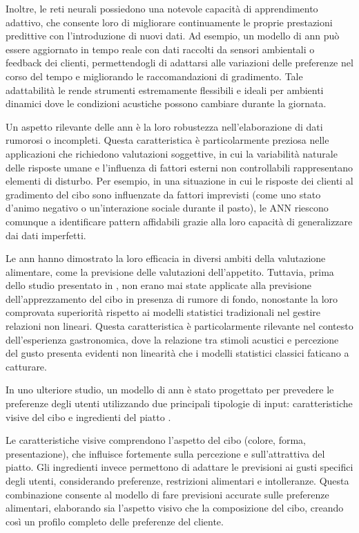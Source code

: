 Inoltre, le reti neurali possiedono una notevole capacità di apprendimento adattivo, che consente loro di migliorare continuamente le proprie prestazioni predittive con l'introduzione di nuovi dati. Ad esempio, un modello di \gls{ann} può essere aggiornato in tempo reale con dati raccolti da sensori ambientali o feedback dei clienti, permettendogli di adattarsi alle variazioni delle preferenze nel corso del tempo e migliorando le raccomandazioni di gradimento. Tale adattabilità le rende strumenti estremamente flessibili e ideali per ambienti dinamici dove le condizioni acustiche possono cambiare durante la giornata.

Un aspetto rilevante delle \gls{ann} è la loro robustezza nell'elaborazione di dati rumorosi o incompleti. Questa caratteristica è particolarmente preziosa nelle applicazioni che richiedono valutazioni soggettive, in cui la variabilità naturale delle risposte umane e l'influenza di fattori esterni non controllabili rappresentano elementi di disturbo. Per esempio, in una situazione in cui le risposte dei clienti al gradimento del cibo sono influenzate da fattori imprevisti (come uno stato d'animo negativo o un'interazione sociale durante il pasto), le ANN riescono comunque a identificare pattern affidabili grazie alla loro capacità di generalizzare dai dati imperfetti. \cite{krishnamurthy2022}

Le \gls{ann} hanno dimostrato la loro efficacia in diversi ambiti della valutazione alimentare, come la previsione delle valutazioni dell'appetito. Tuttavia, prima dello studio presentato in \cite{alamir2021enhanced}, non erano mai state applicate alla previsione dell'apprezzamento del cibo in presenza di rumore di fondo, nonostante la loro comprovata superiorità rispetto ai modelli statistici tradizionali nel gestire relazioni non lineari. Questa caratteristica è particolarmente rilevante nel contesto dell'esperienza gastronomica, dove la relazione tra stimoli acustici e percezione del gusto presenta evidenti non linearità che i modelli statistici classici faticano a catturare.

In uno ulteriore studio, un modello di \gls{ann} è stato progettato per prevedere le preferenze degli utenti utilizzando due principali tipologie di input: caratteristiche visive del cibo e ingredienti del piatto \cite{gao2019hierarchical}. 

Le caratteristiche visive comprendono l'aspetto del cibo (colore, forma, presentazione), che influisce fortemente sulla percezione e sull'attrattiva del piatto. Gli ingredienti invece permettono di adattare le previsioni ai gusti specifici degli utenti, considerando preferenze, restrizioni alimentari e intolleranze. Questa combinazione consente al modello di fare previsioni accurate sulle preferenze alimentari, elaborando sia l'aspetto visivo che la composizione del cibo, creando così un profilo completo delle preferenze del cliente.

